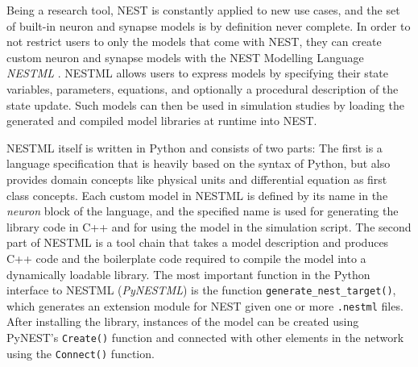 Being a research tool, NEST is constantly applied to new use cases, and the set of built-in neuron and synapse models is by definition never complete. In order to not restrict users to only the models that come with NEST, they can create custom neuron and synapse models with the NEST Modelling Language \emph{NESTML} \citep{plotnikov2016nestml, linssen_charl_a_p_2022_5784175}. NESTML allows users to express models by specifying their state variables, parameters, equations, and optionally a procedural description of the state update. Such models can then be used in simulation studies by loading the generated and compiled model libraries at runtime into NEST.

NESTML itself is written in Python and consists of two parts: The first is a language specification that is heavily based on the syntax of Python, but also provides domain concepts like physical units and differential equation as first class concepts. Each custom model in NESTML is defined by its name in the \emph{neuron} block of the language, and the specified name is used for generating the library code in C++ and for using the model in the simulation script. The second part of NESTML is a tool chain that takes a model description and produces C++ code and the boilerplate code required to compile the model into a dynamically loadable library. The most important function in the Python interface to NESTML (\emph{PyNESTML}) is the function \texttt{generate\_nest\_target()}, which generates an extension module for NEST given one or more \texttt{.nestml} files. After installing the library, instances of the model can be created using PyNEST's \texttt{Create()} function and connected with other elements in the network using the \texttt{Connect()} function.

